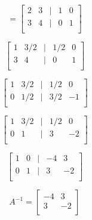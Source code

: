 \documentclass[a4paper]{article}
\begin{document}
\begin{displaymath}
  [A|I]=\begin{bmatrix}
  2&3&|&1&0\\
  3&4&|&0&1\\
  \end{bmatrix}
\end{displaymath}

\begin{displaymath}
  \begin{bmatrix}
    1&3/2&|&1/2&0\\
    3&4&|&0&1\\
  \end{bmatrix}
\end{displaymath}

\begin{displaymath}
  \begin{bmatrix}
    1&3/2&|&1/2&0\\
    0&1/2&|&3/2&-1\\
  \end{bmatrix}
\end{displaymath}

\begin{displaymath}
  \begin{bmatrix}
    1&3/2&|&1/2&0\\
    0&1&|&3&-2\\
  \end{bmatrix}
\end{displaymath}

\begin{displaymath}
  \begin{bmatrix}
    1&0&|&-4&3\\
    0&1&|&3&-2\\
  \end{bmatrix}
\end{displaymath}


\begin{displaymath}
  A^{-1}=
  \begin{bmatrix}
    -4&3\\
    3&-2\\
  \end{bmatrix}
\end{displaymath}
\end{document}
